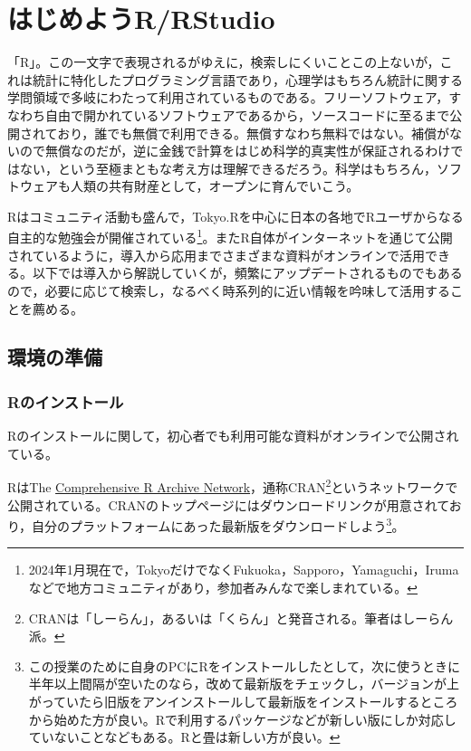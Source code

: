 \documentclass[
  a4paper,
]{ltjsbook}
\begin{document}
\chapter{はじめようR/RStudio}\label{ux306fux3058ux3081ux3088ux3046rrstudio}

「R」。この一文字で表現されるがゆえに，検索しにくいことこの上ないが，これは統計に特化したプログラミング言語であり，心理学はもちろん統計に関する学問領域で多岐にわたって利用されているものである。フリーソフトウェア，すなわち自由で開かれているソフトウェアであるから，ソースコードに至るまで公開されており，誰でも無償で利用できる。無償すなわち無料ではない。補償がないので無償なのだが，逆に金銭で計算をはじめ科学的真実性が保証されるわけではない，という至極まともな考え方は理解できるだろう。科学はもちろん，ソフトウェアも人類の共有財産として，オープンに育んでいこう。

Rはコミュニティ活動も盛んで，Tokyo.Rを中心に日本の各地でRユーザからなる自主的な勉強会が開催されている\footnote{2024年1月現在で，TokyoだけでなくFukuoka，Sapporo，Yamaguchi，Irumaなどで地方コミュニティがあり，参加者みんなで楽しまれている。}。またR自体がインターネットを通じて公開されているように，導入から応用までさまざまな資料がオンラインで活用できる。以下では導入から解説していくが，頻繁にアップデートされるものでもあるので，必要に応じて検索し，なるべく時系列的に近い情報を吟味して活用することを薦める。

\section{環境の準備}\label{ux74b0ux5883ux306eux6e96ux5099}

\subsection{Rのインストール}\label{rux306eux30a4ux30f3ux30b9ux30c8ux30fcux30eb}

Rのインストールに関して，初心者でも利用可能な資料がオンラインで公開されている。

RはThe \href{https://cran.r-project.org/}{Comprehensive R Archive
Network}，通称CRAN\footnote{CRANは「しーらん」，あるいは「くらん」と発音される。筆者はしーらん派。}というネットワークで公開されている。CRANのトップページにはダウンロードリンクが用意されており，自分のプラットフォームにあった最新版をダウンロードしよう\footnote{この授業のために自身のPCにRをインストールしたとして，次に使うときに半年以上間隔が空いたのなら，改めて最新版をチェックし，バージョンが上がっていたら旧版をアンインストールして最新版をインストールするところから始めた方が良い。Rで利用するパッケージなどが新しい版にしか対応していないことなどもある。Rと畳は新しい方が良い。}。
\end{document}
